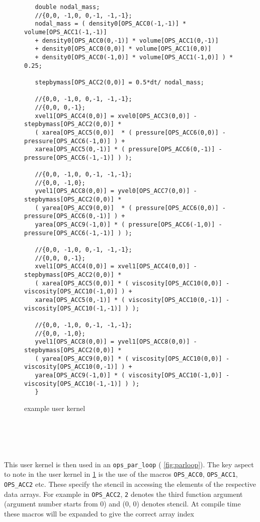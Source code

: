 \documentclass[11pt]{article}
\begin{document}
{\begin{figure}[!h]
\begin{verbatim}
   double nodal_mass;
   //{0,0, -1,0, 0,-1, -1,-1};
   nodal_mass = ( density0[OPS_ACC0(-1,-1)] * volume[OPS_ACC1(-1,-1)]
   + density0[OPS_ACC0(0,-1)] * volume[OPS_ACC1(0,-1)]
   + density0[OPS_ACC0(0,0)] * volume[OPS_ACC1(0,0)]
   + density0[OPS_ACC0(-1,0)] * volume[OPS_ACC1(-1,0)] ) * 0.25;

   stepbymass[OPS_ACC2(0,0)] = 0.5*dt/ nodal_mass;

   //{0,0, -1,0, 0,-1, -1,-1};
   //{0,0, 0,-1};
   xvel1[OPS_ACC4(0,0)] = xvel0[OPS_ACC3(0,0)] - stepbymass[OPS_ACC2(0,0)] *
   ( xarea[OPS_ACC5(0,0)]  * ( pressure[OPS_ACC6(0,0)] - pressure[OPS_ACC6(-1,0)] ) +
   xarea[OPS_ACC5(0,-1)] * ( pressure[OPS_ACC6(0,-1)] - pressure[OPS_ACC6(-1,-1)] ) );

   //{0,0, -1,0, 0,-1, -1,-1};
   //{0,0, -1,0};
   yvel1[OPS_ACC8(0,0)] = yvel0[OPS_ACC7(0,0)] - stepbymass[OPS_ACC2(0,0)] *
   ( yarea[OPS_ACC9(0,0)]  * ( pressure[OPS_ACC6(0,0)] - pressure[OPS_ACC6(0,-1)] ) +
   yarea[OPS_ACC9(-1,0)] * ( pressure[OPS_ACC6(-1,0)] - pressure[OPS_ACC6(-1,-1)] ) );

   //{0,0, -1,0, 0,-1, -1,-1};
   //{0,0, 0,-1};
   xvel1[OPS_ACC4(0,0)] = xvel1[OPS_ACC4(0,0)] - stepbymass[OPS_ACC2(0,0)] *
   ( xarea[OPS_ACC5(0,0)] * ( viscosity[OPS_ACC10(0,0)] - viscosity[OPS_ACC10(-1,0)] ) +
   xarea[OPS_ACC5(0,-1)] * ( viscosity[OPS_ACC10(0,-1)] - viscosity[OPS_ACC10(-1,-1)] ) );

   //{0,0, -1,0, 0,-1, -1,-1};
   //{0,0, -1,0};
   yvel1[OPS_ACC8(0,0)] = yvel1[OPS_ACC8(0,0)] - stepbymass[OPS_ACC2(0,0)] *
   ( yarea[OPS_ACC9(0,0)] * ( viscosity[OPS_ACC10(0,0)] - viscosity[OPS_ACC10(0,-1)] ) +
   yarea[OPS_ACC9(-1,0)] * ( viscosity[OPS_ACC10(-1,0)] - viscosity[OPS_ACC10(-1,-1)] ) );
   }
\end{verbatim}
\caption{\small example user kernel}
\normalsize\vspace{-0pt}\label{fig:example}
\end{figure}\\\\\\\\


\noindent This user kernel is then used in an \texttt{ops\_par\_loop} (\figurename{ \ref{fig:parloop}}). The key aspect
to note in the user kernel in \figurename{ \ref{fig:example}} is the use of the macros \texttt{OPS\_ACC0}, \texttt{OPS\_ACC1}, 
\texttt{OPS\_ACC2} etc. These specify the stencil in accessing the elements of the respective data arrays. For example in 
\texttt{OPS\_ACC2}, \texttt{2} denotes the third function argument (argument number starts from 0) and (0, 0) denotes stencil. At compile 
time these macros will be expanded to give the correct array index 

}
\end{document}
